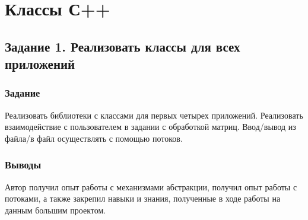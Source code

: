 \documentclass[12pt,a4paper]{report}
\begin{document}
%

\chapter{Классы С++}
\section{Задание 1. Реализовать классы для всех приложений}
\subsection{Задание}
\hspace{\parindent}
Реализовать библиотеки с классами для первых четырех приложений. Реализовать взаимодействие с пользователем в задании с обработкой матриц. Ввод/вывод из файла/в файл осуществлять с помощью потоков.
\subsection{Выводы}
\hspace{\parindent}
Автор получил опыт работы с механизмами абстракции, получил опыт работы с потоками, а также закрепил навыки и знания, полученные в ходе работы на данным большим проектом.
\end{document}
